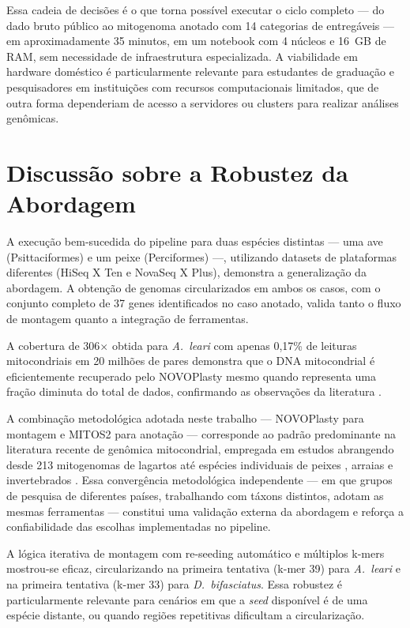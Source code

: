 Essa cadeia de decisões é o que torna possível executar o ciclo completo --- do dado bruto público ao mitogenoma anotado com 14 categorias de entregáveis --- em aproximadamente 35 minutos, em um notebook com 4 núcleos e 16~GB de RAM, sem necessidade de infraestrutura especializada. A viabilidade em hardware doméstico é particularmente relevante para estudantes de graduação e pesquisadores em instituições com recursos computacionais limitados, que de outra forma dependeriam de acesso a servidores ou clusters para realizar análises genômicas.


\section{Discussão sobre a Robustez da Abordagem}

A execução bem-sucedida do pipeline para duas espécies distintas --- uma ave (Psittaciformes) e um peixe (Perciformes) ---, utilizando datasets de plataformas diferentes (HiSeq X Ten e NovaSeq X Plus), demonstra a generalização da abordagem. A obtenção de genomas circularizados em ambos os casos, com o conjunto completo de 37 genes identificados no caso anotado, valida tanto o fluxo de montagem quanto a integração de ferramentas.

A cobertura de 306$\times$ obtida para \textit{A.~leari} com apenas 0,17\% de leituras mitocondriais em 20 milhões de pares demonstra que o DNA mitocondrial é eficientemente recuperado pelo NOVOPlasty mesmo quando representa uma fração diminuta do total de dados, confirmando as observações da literatura \cite{dierckxsens2017}.

A combinação metodológica adotada neste trabalho --- NOVOPlasty para montagem e MITOS2 para anotação --- corresponde ao padrão predominante na literatura recente de genômica mitocondrial, empregada em estudos abrangendo desde 213 mitogenomas de lagartos \cite{zhan2024} até espécies individuais de peixes \cite{kundu2024}, arraias \cite{guerreiro2025} e invertebrados \cite{shi2024,tao2024}. Essa convergência metodológica independente --- em que grupos de pesquisa de diferentes países, trabalhando com táxons distintos, adotam as mesmas ferramentas --- constitui uma validação externa da abordagem e reforça a confiabilidade das escolhas implementadas no pipeline.

A lógica iterativa de montagem com re-seeding automático e múltiplos k-mers mostrou-se eficaz, circularizando na primeira tentativa (k-mer 39) para \textit{A.~leari} e na primeira tentativa (k-mer 33) para \textit{D.~bifasciatus}. Essa robustez é particularmente relevante para cenários em que a \textit{seed} disponível é de uma espécie distante, ou quando regiões repetitivas dificultam a circularização.

